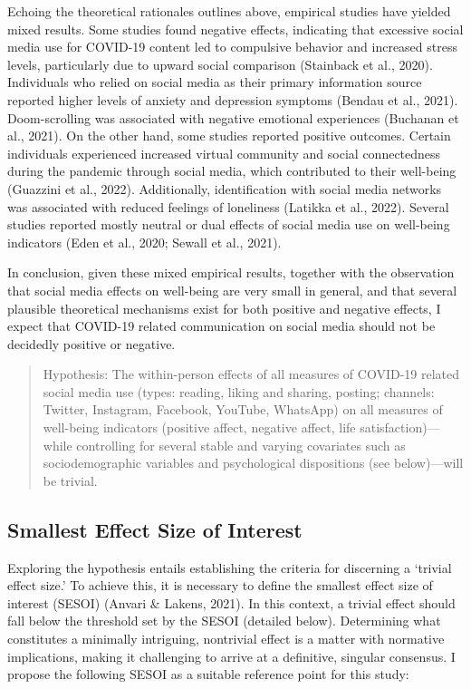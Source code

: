 \documentclass[
  man,mask,floatsintext]{apa7}
\begin{document}
Echoing the theoretical rationales outlines above, empirical studies have yielded mixed results.
Some studies found negative effects, indicating that excessive social media use for COVID-19 content led to compulsive behavior and increased stress levels, particularly due to upward social comparison (Stainback et al., 2020).
Individuals who relied on social media as their primary information source reported higher levels of anxiety and depression symptoms (Bendau et al., 2021).
Doom-scrolling was associated with negative emotional experiences (Buchanan et al., 2021).
On the other hand, some studies reported positive outcomes.
Certain individuals experienced increased virtual community and social connectedness during the pandemic through social media, which contributed to their well-being (Guazzini et al., 2022).
Additionally, identification with social media networks was associated with reduced feelings of loneliness (Latikka et al., 2022).
Several studies reported mostly neutral or dual effects of social media use on well-being indicators (Eden et al., 2020; Sewall et al., 2021).

In conclusion, given these mixed empirical results, together with the observation that social media effects on well-being are very small in general, and that several plausible theoretical mechanisms exist for both positive and negative effects, I expect that COVID-19 related communication on social media should not be decidedly positive or negative.

\begin{quote}
Hypothesis: The within-person effects of all measures of COVID-19 related social media use (types: reading, liking and sharing, posting; channels: Twitter, Instagram, Facebook, YouTube, WhatsApp) on all measures of well-being indicators (positive affect, negative affect, life satisfaction)---while controlling for several stable and varying covariates such as sociodemographic variables and psychological dispositions (see below)---will be trivial.
\end{quote}

\subsection{Smallest Effect Size of Interest}\label{smallest-effect-size-of-interest}

Exploring the hypothesis entails establishing the criteria for discerning a `trivial effect size.'
To achieve this, it is necessary to define the smallest effect size of interest (SESOI) (Anvari \& Lakens, 2021).
In this context, a trivial effect should fall below the threshold set by the SESOI (detailed below).
Determining what constitutes a minimally intriguing, nontrivial effect is a matter with normative implications, making it challenging to arrive at a definitive, singular consensus.
I propose the following SESOI as a suitable reference point for this study:
\end{document}

